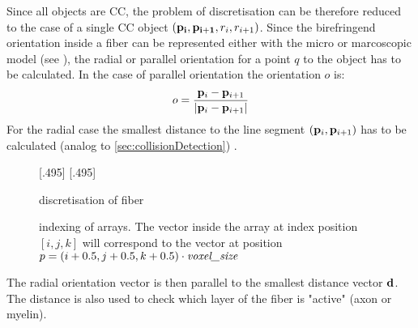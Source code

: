 Since all objects are \ac{CC}, the problem of discretisation can be therefore reduced to the case of a single \ac{CC} object $(\mathbf{p_i}, \mathbf{p_{i+1}}, r_i, r_{i+1})$.
% 
Since the birefringend orientation inside a fiber can be represented either with the micro or marcoscopic model (see \dummy{}), the radial or parallel orientation for a point $q$ to the object has to be calculated.
In the case of parallel orientation the orientation $o$ is:
\begin{align}
\begin{split}
    o = \frac{\mathbf{p}_i - \mathbf{p}_{i+1}}{\lvert\mathbf{p}_i - \mathbf{p}_{i+1}\rvert}
\end{split}
\end{align}
% 
For the radial case the smallest distance to the line segment $(\mathbf{p}_i,\mathbf{p}_{i+1})$ has to be calculated (analog to \cref{sec:collisionDetection}) .
% 
\begin{figure}[!t]
\centering
\setlength{\tikzwidth}{0.45\textwidth}\hfill
{}[.495\textwidth]{
} \hfill
{}[.495\textwidth]{
}\hfill
\caption{discretisation of fiber}
\label{fig:fiber_discretisation}
\end{figure}
% 
\begin{figure}[!t]
\centering
\def\tikzwidth{0.33\textwidth}
\caption{indexing of arrays.
The vector inside the array at index position $[i,j,k]$ will correspond to the vector at position $p=(i+0.5,j+0.5,k+0.5)\cdot \mathit{\textit{voxel\_size}}$}
\label{fig:indexing_array}
\end{figure}
% 
The radial orientation vector is then parallel to the smallest distance vector $\mathbf{d}$.
The distance is also used to check which layer of the fiber is "active" (\eg axon or myelin). 
% 
% 
